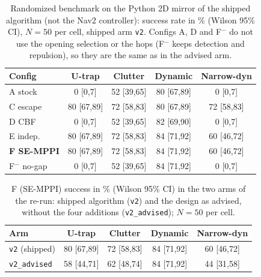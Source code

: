 \documentclass[journal]{IEEEtran}
\begin{document}
\begin{table}[t]
\centering
\caption{Randomized benchmark on the Python 2D mirror of the shipped algorithm (not the
Nav2 controller): success rate in \% (Wilson 95\% CI), $N=50$ per cell, shipped
arm \texttt{v2}. Configs A, D and F$^{-}$ do not use the opening selection or the hops
(F$^{-}$ keeps detection and repulsion), so they are the same as in the advised arm.}
\label{tab:bench2d-success}
\footnotesize
\setlength{\tabcolsep}{3.5pt}
\begin{tabular}{lcccc}
\toprule
Config & U-trap & Clutter & Dynamic & Narrow-dyn \\
\midrule
A stock            & 0 [0,7]    & 52 [39,65] & 80 [67,89] & 0 [0,7]    \\
C escape           & 80 [67,89] & 72 [58,83] & 80 [67,89] & 72 [58,83] \\
D CBF              & 0 [0,7]    & 52 [39,65] & 82 [69,90] & 0 [0,7]    \\
E indep.           & 80 [67,89] & 72 [58,83] & 84 [71,92] & 60 [46,72] \\
\textbf{F SE-MPPI} & 80 [67,89] & 72 [58,83] & 84 [71,92] & 60 [46,72] \\
F$^{-}$ no-gap     & 0 [0,7]    & 52 [39,65] & 84 [71,92] & 0 [0,7]    \\
\bottomrule
\end{tabular}
\end{table}

\begin{table}[t]
\centering
\caption{F (SE-MPPI) success in \% (Wilson 95\% CI) in the two arms of the re-run:
shipped algorithm (\texttt{v2}) and the design as advised, without the four additions
(\texttt{v2\_advised}); $N=50$ per cell.}
\label{tab:bench2d-arms}
\footnotesize
\setlength{\tabcolsep}{3.5pt}
\begin{tabular}{lcccc}
\toprule
Arm & U-trap & Clutter & Dynamic & Narrow-dyn \\
\midrule
\texttt{v2} (shipped) & 80 [67,89] & 72 [58,83] & 84 [71,92] & 60 [46,72] \\
\texttt{v2\_advised}  & 58 [44,71] & 62 [48,74] & 84 [71,92] & 44 [31,58] \\
\bottomrule
\end{tabular}
\end{table}
\end{document}

